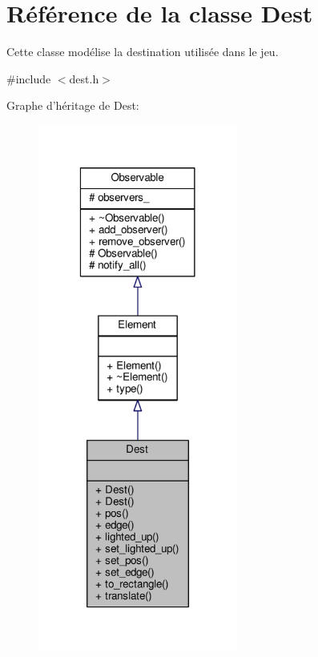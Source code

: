\hypertarget{classDest}{\section{Référence de la classe Dest}
\label{classDest}
}


Cette classe modélise la destination utilisée dans le jeu.  




{\ttfamily \#include $<$dest.\+h$>$}



Graphe d'héritage de Dest\+:
\nopagebreak
\begin{figure}[H]
\begin{center}
\leavevmode
\includegraphics[width=186pt]{d9/d5c/classDest__inherit__graph}
\end{center}
\end{figure}


